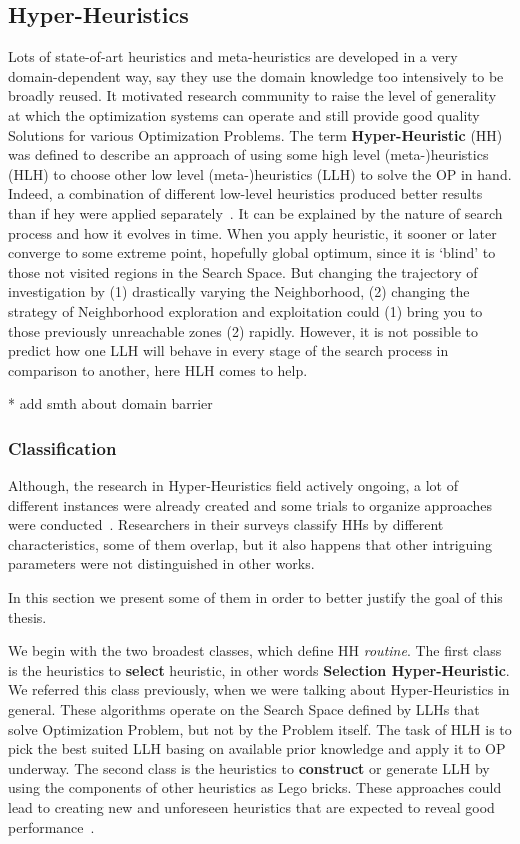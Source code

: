 \subsection{Hyper-Heuristics}
Lots of state-of-art heuristics and meta-heuristics are developed in a very domain-dependent way, say they use the domain knowledge too intensively to be broadly reused. It motivated research community to raise the level of generality at which the optimization systems can operate and still provide good quality Solutions for various Optimization Problems. The term \textbf{Hyper-Heuristic} (HH) was defined to describe an approach of using some high level (meta-)heuristics (HLH) to choose other low level (meta-)heuristics (LLH) to solve the OP in hand. Indeed, a combination of different low-level heuristics produced better results than if hey were applied separately~\cite{drake2019recent}.
It can be explained by the nature of search process and how it evolves in time. When you apply heuristic, it sooner or later converge to some extreme point, hopefully global optimum, since it is `blind' to those not visited regions in the Search Space. But changing the trajectory of investigation by (1) drastically varying the Neighborhood, (2) changing the strategy of Neighborhood exploration and exploitation could (1) bring you to those previously unreachable zones (2) rapidly. However, it is not possible to predict how one LLH will behave in every stage of the search process in comparison to another, here HLH comes to help.

* add smth about domain barrier 

\subsubsection{Classification}
Although, the research in Hyper-Heuristics field actively ongoing, a lot of different instances were already created and some trials to organize approaches were conducted~\cite{ryser2014review,drake2019recent,burke2019classification,kerschke2019automated}.
Researchers in their surveys classify HHs by different characteristics, some of them overlap, but it also happens that other intriguing parameters were not distinguished in other works. 

In this section we present some of them in order to better justify the goal of this thesis.


We begin with the two broadest classes, which define HH \textit{routine}. The first class is the heuristics to \textbf{select} heuristic, in other words \textbf{Selection Hyper-Heuristic}. We referred this class previously, when we were talking about Hyper-Heuristics in general. These algorithms operate on the Search Space defined by LLHs that solve Optimization Problem, but not by the Problem itself. The task of HLH is to pick the best suited LLH basing on available prior knowledge and apply it to OP underway. The second class is the heuristics to \textbf{construct} or generate LLH by using the components of other heuristics as Lego bricks. These approaches could lead to creating new and unforeseen heuristics that are expected to reveal good performance~\cite{burke2019classification}.


